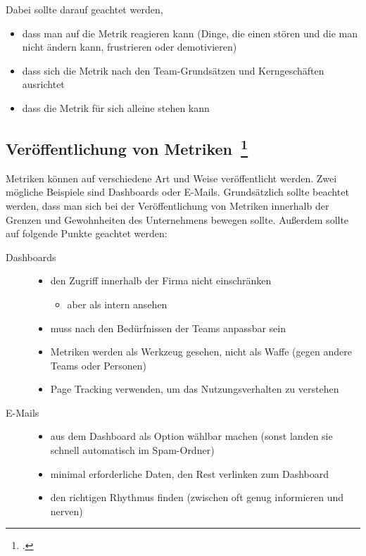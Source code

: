 Dabei sollte darauf geachtet werden,
\begin{itemize}
  \item dass man auf die Metrik reagieren kann (Dinge, die einen stören und die man nicht ändern kann, frustrieren oder demotivieren)
  \item dass sich die Metrik nach den Team-Grundsätzen und Kerngeschäften ausrichtet
  \item dass die Metrik für sich alleine stehen kann
\end{itemize}

\subsection[Veröffentlichung von Metriken]{Veröffentlichung von Metriken~\footcite[vgl.][S.177ff]{davis_agile_2015}}

Metriken können auf verschiedene Art und Weise veröffentlicht werden. Zwei mögliche Beispiele sind Dashboards oder E-Mails.
Grundsätzlich sollte beachtet werden, dass man sich bei der Veröffentlichung von Metriken innerhalb der Grenzen und Gewohnheiten des Unternehmens bewegen sollte.
Außerdem sollte auf folgende Punkte geachtet werden:

\begin{description}
  \item[Dashboards] \hfill
  \begin{itemize}[noitemsep]
    \item den Zugriff innerhalb der Firma nicht einschränken
    \begin{itemize}[noitemsep]
      \item aber als intern ansehen
    \end{itemize}
    \item muss nach den Bedürfnissen der Teams anpassbar sein
    \item Metriken werden als Werkzeug gesehen, nicht als Waffe (gegen andere Teams oder Personen)
    \item Page Tracking verwenden, um das Nutzungsverhalten zu verstehen
  \end{itemize}
  \item[E-Mails] \hfill
  \begin{itemize}[noitemsep]
    \item aus dem Dashboard als Option wählbar machen (sonst landen sie schnell automatisch im Spam-Ordner)
    \item minimal erforderliche Daten, den Rest verlinken zum Dashboard
    \item den richtigen Rhythmus finden (zwischen oft genug informieren und nerven)
  \end{itemize}
\end{description}


